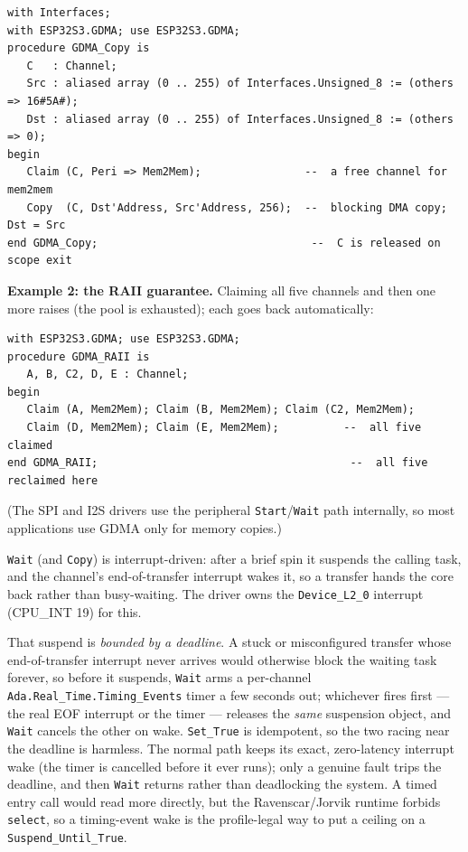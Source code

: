 \begin{lstlisting}
with Interfaces;
with ESP32S3.GDMA; use ESP32S3.GDMA;
procedure GDMA_Copy is
   C   : Channel;
   Src : aliased array (0 .. 255) of Interfaces.Unsigned_8 := (others => 16#5A#);
   Dst : aliased array (0 .. 255) of Interfaces.Unsigned_8 := (others => 0);
begin
   Claim (C, Peri => Mem2Mem);                --  a free channel for mem2mem
   Copy  (C, Dst'Address, Src'Address, 256);  --  blocking DMA copy; Dst = Src
end GDMA_Copy;                                 --  C is released on scope exit
\end{lstlisting}

\textbf{Example 2: the RAII guarantee.} Claiming all five channels and then
one more raises (the pool is exhausted); each goes back automatically:
\begin{lstlisting}
with ESP32S3.GDMA; use ESP32S3.GDMA;
procedure GDMA_RAII is
   A, B, C2, D, E : Channel;
begin
   Claim (A, Mem2Mem); Claim (B, Mem2Mem); Claim (C2, Mem2Mem);
   Claim (D, Mem2Mem); Claim (E, Mem2Mem);          --  all five claimed
end GDMA_RAII;                                       --  all five reclaimed here
\end{lstlisting}
(The SPI and I2S drivers use the peripheral \texttt{Start}/\texttt{Wait} path
internally, so most applications use GDMA only for memory copies.)

\texttt{Wait} (and \texttt{Copy}) is interrupt-driven: after a brief spin it
suspends the calling task, and the channel's end-of-transfer interrupt wakes it,
so a transfer hands the core back rather than busy-waiting. The driver owns the
\texttt{Device\_L2\_0} interrupt (CPU\_INT 19) for this.

That suspend is \emph{bounded by a deadline}. A stuck or misconfigured transfer
whose end-of-transfer interrupt never arrives would otherwise block the waiting task
forever, so before it suspends, \texttt{Wait} arms a per-channel
\texttt{Ada.Real\_Time.Timing\_Events} timer a few seconds out; whichever fires
first --- the real EOF interrupt or the timer --- releases the \emph{same}
suspension object, and \texttt{Wait} cancels the other on wake. \texttt{Set\_True}
is idempotent, so the two racing near the deadline is harmless. The normal path
keeps its exact, zero-latency interrupt wake (the timer is cancelled before it ever
runs); only a genuine fault trips the deadline, and then \texttt{Wait} returns
rather than deadlocking the system. A timed entry call would read more directly, but
the Ravenscar/Jorvik runtime forbids \texttt{select}, so a timing-event wake is the
profile-legal way to put a ceiling on a \texttt{Suspend\_Until\_True}.

